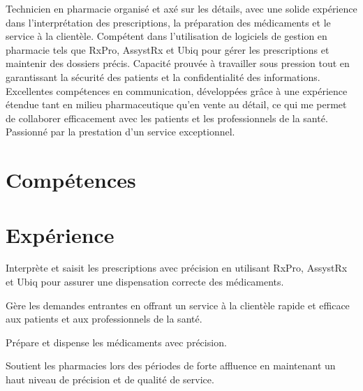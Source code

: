\documentclass[letterpaper,10pt]{article}
\begin{document}

Technicien en pharmacie organisé et axé sur les détails, avec une solide expérience dans l’interprétation des prescriptions, la préparation des médicaments et le service à la clientèle. Compétent dans l’utilisation de logiciels de gestion en pharmacie tels que RxPro, AssystRx et Ubiq pour gérer les prescriptions et maintenir des dossiers précis. Capacité prouvée à travailler sous pression tout en garantissant la sécurité des patients et la confidentialité des informations. Excellentes compétences en communication, développées grâce à une expérience étendue tant en milieu pharmaceutique qu’en vente au détail, ce qui me permet de collaborer efficacement avec les patients et les professionnels de la santé. Passionné par la prestation d’un service exceptionnel.

\section{Compétences}

\begin{skill_list}
\end{skill_list}
\section{Expérience}

\begin{resume_list}
\item Interprète et saisit les prescriptions avec précision en utilisant RxPro, AssystRx et Ubiq pour assurer une dispensation correcte des médicaments.
\item Gère les demandes entrantes en offrant un service à la clientèle rapide et efficace aux patients et aux professionnels de la santé.
\item Prépare et dispense les médicaments avec précision.
\item Soutient les pharmacies lors des périodes de forte affluence en maintenant un haut niveau de précision et de qualité de service.
\end{resume_list}
\end{document}
